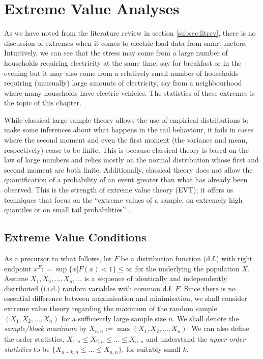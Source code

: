 
\chapter{Extreme Value Analyses} \label{sec:EVT}

As we have noted from the literature review in section \ref{subsec:litrev}, there is no discussion of extremes when it comes to electric load data from smart meters. Intuitively, we can see that the stress may come from a large number of households requiring electricity at the same time, say for breakfast or in the evening but it may also come from a relatively small number of households requiring (unusually) large amounts of electricity, say from a neighbourhood where many households have electric vehicles. The statistics of these extremes is the topic of this chapter.

While classical large sample theory allows the use of empirical distributions to make some inferences about what happens in the tail behaviour, it fails in cases where the second moment and even the first moment (the variance and mean, respectively) cease to be finite. This is because classical theory is based on the law of large numbers and relies mostly on the normal distribution whose first and second moment are both finite. Additionally, classical theory does not allow the quantification of a probability of an event greater than what has already been observed. This is the strength of extreme value theory (EVT); it offers us techniques that focus on the ``extreme values of a sample, on extremely high quantiles or on small tail probabilities'' \cite[ch.~1]{beirlant}.

\section{Extreme Value Conditions} \label{subsec:EVT}

As a precursor to what follows, let $F$ be a distribution function (d.f.) with right endpoint $x^F : = \sup\{x | F(x) < 1\} \le \infty$ for the underlying the population $X$. Assume $X_1,X_2, \ldots, X_n, \ldots$ is a sequence of identically and independently distributed (i.i.d.) random variables with common d.f. $F$. Since there is no essential difference between maximisation and minimisation, we shall consider extreme value theory regarding the maximum of the random sample $(X_1,X_2, \ldots, X_n)$ for a sufficiently large sample size $n$. We shall denote the \textit{sample/block maximum} by $X_{n,n}:= \max(X_1,X_2, \ldots, X_n)$. We can also define the order statistics, $X_{1,n} \le X_{2,n} \le ... \le X_{n,n}$ and understand the \textit{upper order statistics} to  be $\{X_{n-k,n} \le ... \le X_{n,n}\}$, for suitably small $k$.%

